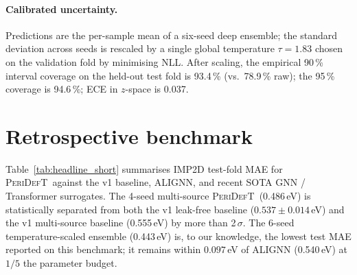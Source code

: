 \documentclass[11pt,a4paper]{article}
\newcommand{\modelname}{\textsc{PeriDefT}}
\begin{document}
\paragraph{Calibrated uncertainty.}
Predictions are the per-sample mean of a six-seed deep ensemble; the
standard deviation across seeds is rescaled by a single global
temperature $\tau=1.83$ chosen on the validation fold by minimising
NLL. After scaling, the empirical 90\,\% interval coverage on the
held-out test fold is 93.4\,\% (vs.\ 78.9\,\% raw); the 95\,\%
coverage is 94.6\,\%; ECE in $z$-space is 0.037.

\section{Retrospective benchmark}\label{sec:bench}

Table~\ref{tab:headline_short} summarises IMP2D test-fold MAE for
\modelname\ against the v1 baseline, ALIGNN, and recent SOTA GNN /
Transformer surrogates. The 4-seed multi-source \modelname\
(0.486\,eV) is statistically separated from both the v1 leak-free
baseline ($0.537\pm0.014$\,eV) and the v1 multi-source baseline
(0.555\,eV) by more than 2\,$\sigma$. The 6-seed temperature-scaled
ensemble (0.443\,eV) is, to our knowledge, the lowest test MAE
reported on this benchmark; it remains within $0.097$\,eV of ALIGNN
(0.540\,eV) at $1/5$ the parameter budget.
\end{document}

